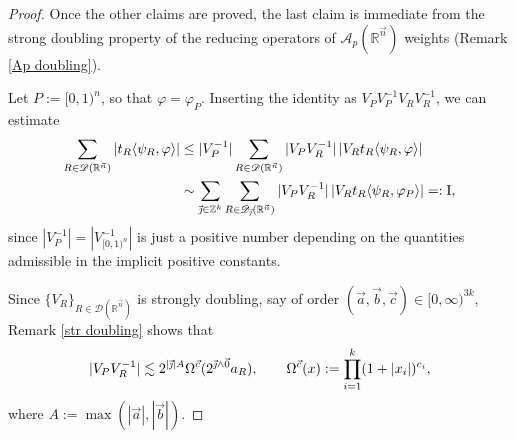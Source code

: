 \documentclass[11pt, reqno]{amsart}
\theoremstyle{definition}
\theoremstyle{remark}
\numberwithin{equation}{section}
\newcommand{\A}{\mathscr A}
\newcommand{\D}{\mathscr D}
\newcommand{\R}{\mathbb R}
\newcommand{\Z}{\mathbb Z}
\newcommand{\vnull}{\vec 0}
\newcommand{\va}{\vec a}
\newcommand{\vb}{\vec b}
\newcommand{\vc}{\vec c}
\newcommand{\vj}{\vec{\textit{\j}}}
\newcommand{\vn}{\vec n}
\newcommand{\pair}[2]{\langle #1, #2 \rangle}
\newcommand{\abs}[1]{|#1|}
\begin{document}
\begin{proof}
Once the other claims are proved, the last claim is immediate from the strong doubling property of the reducing operators of $\A_p(\R^{\vn})$ weights (Remark \ref{Ap doubling}).

Let $P:=[0,1)^n$, so that $\varphi=\varphi_P$. Inserting the identity as $V_PV_P^{-1}V_RV_R^{-1}$, we can estimate
\begin{equation*}
\begin{split}
\sum_{R\in\D(\R^{\vn})}\abs{t_R\pair{\psi_R}{\varphi}}
&\leq\abs{V_P^{-1}}\sum_{R\in\D(\R^{\vn})}
\abs{V_P V_R^{-1}} \, \abs{V_R t_R\pair{\psi_R}{\varphi}} \\
&\sim\sum_{\vj\in\Z^k}\sum_{R\in\D_{\vj}(\R^{\vn})}
\abs{V_PV_R^{-1}} \, \abs{V_R t_R\pair{\psi_R}{\varphi_P}}
=: \mathrm{I},
\end{split}
\end{equation*}
since $\abs{V_P^{-1}}=\abs{V_{[0,1)^n}^{-1}}$ is just a positive number depending on the quantities admissible in the implicit positive constants.

Since $\{V_R\}_{R\in\D(\R^{\vn})}$ is strongly doubling, say of order $(\va,\vb,\vc)\in[0,\infty)^{3k}$, Remark \ref{str doubling} shows that
\begin{equation*}
  \abs{V_P V_R^{-1}}\lesssim 2^{\abs{\vj}A} \Omega^{\vc} (2^{\vj\wedge\vnull}a_R),
  \qquad\Omega^{\vc}(x):=\prod_{i=1}^k(1+\abs{x_i})^{c_i},
\end{equation*}
where $A:=\max(\abs{\va},\abs{\vb})$.


\end{proof}
\end{document}
